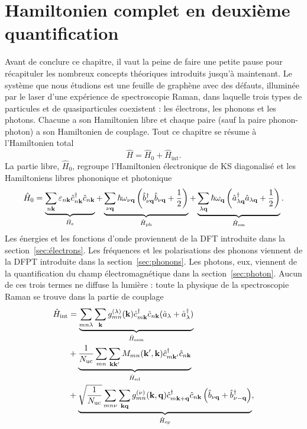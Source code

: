 \section{Hamiltonien complet en deuxième quantification}\label{sec:hamiltonien}

Avant de conclure ce chapitre, il vaut la peine de faire une petite pause pour récapituler les nombreux concepts théoriques introduits jusqu'à maintenant. Le système que nous étudions est une feuille de graphène avec des défauts, illuminée par le laser d'une expérience de spectroscopie Raman, dans laquelle trois types de particules et de quasiparticules coexistent : les électrons, les phonons et les photons. Chacune a son Hamiltonien libre et chaque paire (sauf la paire phonon-photon) a son Hamiltonien de couplage. Tout ce chapitre se résume à l'Hamiltonien total
\begin{equation}
    \hat{H} = \hat{H}_0+\hat{H}_\text{int}.
\end{equation}
La partie libre, $\hat{H}_0$, regroupe l'Hamiltonien électronique de KS diagonalisé et les Hamiltoniens libres phononique et photonique
\begin{equation}
    \hat{H}_0 =\underbrace{\sum_{n\mathbf{k}}\varepsilon_{n\mathbf{k}}\hat{c}^\dag_{n\mathbf{k}}\hat{c}_{n\mathbf{k}}}_{\hat{H}_\text{e}} + \underbrace{\sum_{\nu\mathbf{q}}\hbar\omega_{\nu\mathbf{q}}\left(\hat{b}^\dag_{\nu\mathbf{q}}\hat{b}_{\nu\mathbf{q}}+\frac{1}{2}\right)}_{\hat{H}_\text{ph}}+\underbrace{\sum_{\lambda\mathbf{q}}\hbar\omega_{\mathbf{q}}\left(\hat{a}_{\lambda\mathbf{q}}^\dag \hat{a}_{\lambda\mathbf{q}}+\frac{1}{2}\right)}_{\hat{H}_\text{em}}.
\end{equation}
Les énergies et les fonctions d'onde proviennent de la DFT introduite dans la section~\ref{sec:électrons}. Les fréquences et les polarisations des phonons viennent de la DFPT introduite dans la section~\ref{sec:phonons}. Les photons, eux, viennent de la quantification du champ électromagnétique dans la section~\ref{sec:photon}. Aucun de ces trois termes ne diffuse la lumière : toute la physique de la spectroscopie Raman se trouve dans la partie de couplage
\begin{equation}
    \begin{split}
    \hat{H}_\text{int} &= \underbrace{\sum_{mn\lambda}\sum_{\mathbf{k}} g_{mn}^{(\lambda)}(\mathbf{k})\hat{c}^\dag_{m\mathbf{k}}\hat{c}_{n\mathbf{k}}(\hat{a}_\lambda+\hat{a}_\lambda^\dag)}_{\hat{H}_\text{eem}}\\
    &+ \underbrace{\frac{1}{N_\text{uc}}\sum_{mn}\sum_{\mathbf{k}\mathbf{k}'}M_{mn}(\mathbf{k}',\mathbf{k})\hat{c}^\dag_{m\mathbf{k}'}\hat{c}_{n\mathbf{k}}}_{\hat{H}_\text{ed}}\\
    &+ \underbrace{\sqrt{\frac{1}{N_\text{uc}}}\sum_{mn\nu}\sum_{\mathbf{k}\mathbf{q}}g_{mn}^{(\nu)}(\mathbf{k},\mathbf{q})\hat{c}^\dag_{m\mathbf{k}+\mathbf{q}}\hat{c}_{n\mathbf{k}}\left(\hat{b}_{\nu\mathbf{q}}+\hat{b}^\dag_{\nu-\mathbf{q}}\right)}_{\hat{H}_\text{ep}},
    \end{split}
    \label{eqn:H_int}
\end{equation}
